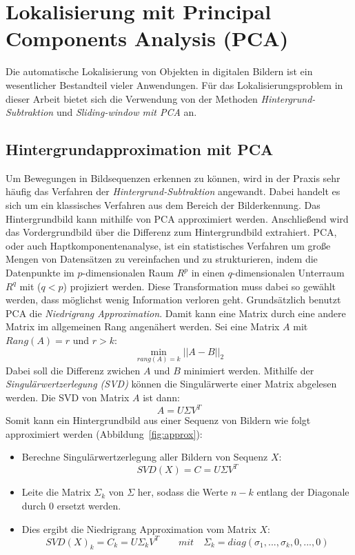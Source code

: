 \newpage
\section{ Lokalisierung mit Principal Components Analysis (PCA)}
Die automatische Lokalisierung von Objekten in digitalen Bildern ist ein wesentlicher Bestandteil vieler Anwendungen. 
Für das Lokalisierungsproblem in dieser Arbeit bietet sich die Verwendung von der Methoden \textit{Hintergrund-Subtraktion} und \textit{Sliding-window mit PCA} an.

\subsection{Hintergrundapproximation mit PCA}
Um Bewegungen in Bildsequenzen erkennen zu können, wird in der Praxis sehr häufig das Verfahren der \textit{Hintergrund-Subtraktion} angewandt. Dabei handelt es sich um ein klassisches Verfahren aus dem Bereich der Bilderkennung. Das Hintergrundbild kann mithilfe von PCA approximiert werden. Anschließend wird das Vordergrundbild über die Differenz zum Hintergrundbild extrahiert. PCA, oder auch Haptkomponentenanalyse, ist ein statistisches Verfahren um große Mengen von Datensätzen zu vereinfachen und zu strukturieren, indem die Datenpunkte im $p$-dimensionalen Raum $R^p$ in einen $q$-dimensionalen Unterraum ${R} ^{q}$ mit ($q<p$) projiziert werden. Diese Transformation muss dabei so gewählt werden, dass möglichst wenig Information verloren geht. 
Grundsätzlich benutzt PCA die \textit{Niedrigrang Approximation}. Damit kann eine Matrix durch eine andere Matrix im allgemeinen Rang angenähert werden. Sei eine Matrix $A$ mit $Rang(A) = r$ und $r > k$:
\begin{equation}
\min_{rang(A)=k}||A-B||_2 
\end{equation}
Dabei soll die Differenz zwichen $A$ und $B$ minimiert werden. Mithilfe der \textit{Singulärwertzerlegung (SVD)} können die Singulärwerte einer Matrix abgelesen werden. Die SVD von Matrix $A$ ist dann:
\begin{equation}
A = U \Sigma V^T
\end{equation}
Somit kann ein Hintergrundbild aus einer Sequenz von Bildern wie folgt approximiert werden (Abbildung~\ref{fig:approx}):
\begin{itemize}
\item{Berechne Singulärwertzerlegung aller Bildern von Sequenz $X$:}
\begin{equation}
SVD(X)= C = U \Sigma V^T
\end{equation}
\item{Leite die Matrix ${\Sigma_k}$ von ${\Sigma}$ her, sodass die Werte ${n - k}$  entlang der Diagonale durch 0 ersetzt werden.}
\item{Dies ergibt die Niedrigrang Approximation vom Matrix $X$:}
\begin{equation}
SVD(X)_k=C_k = U\Sigma_kV^T \quad\quad mit  \quad  \Sigma_k = diag(\sigma_1, ..., \sigma_k,0,...,0)
\end{equation}
\end{itemize}
